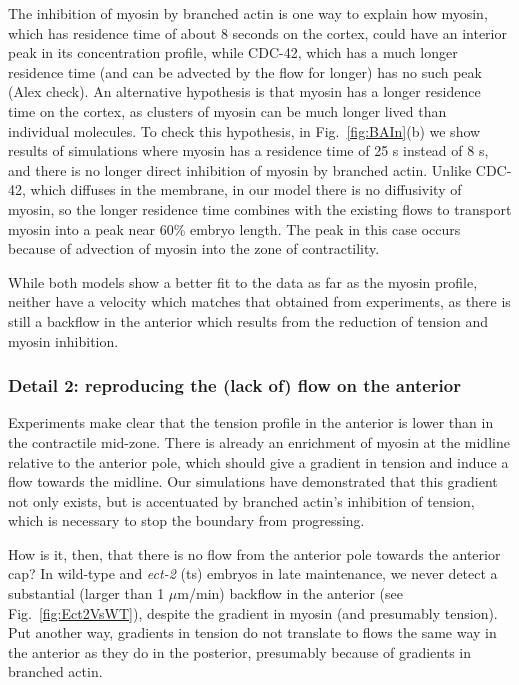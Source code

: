 \documentclass[11pt]{article}
\newcommand{\red}[1]{\color{red}#1\normalcolor}
\newcommand{\6}[1]{#1_{\text{6}}}
\newcommand{\3}[1]{#1_{\text{3}}}
\begin{document}
The inhibition of myosin by branched actin is one way to explain how myosin, which has residence time of about 8 seconds on the cortex, could have an interior peak in its concentration profile, while CDC-42, which has a much longer residence time (and can be advected by the flow for longer) \red{has no such peak (Alex check)}. An alternative hypothesis is that myosin has a longer residence time on the cortex, as clusters of myosin can be much longer lived than individual molecules. To check this hypothesis, in Fig.\ \ref{fig:BAIn}(b) we show results of simulations where myosin has a residence time of 25 s instead of 8 s, and there is no longer direct inhibition of myosin by branched actin. Unlike CDC-42, which diffuses in the membrane, in our model there is no diffusivity of myosin, so the longer residence time combines with the existing flows to transport myosin into a peak near 60\% embryo length. The peak in this case occurs because of advection of myosin into the zone of contractility. 

While both models show a better fit to the data as far as the myosin profile, neither have a velocity which matches that obtained from experiments, as there is still a backflow in the anterior which results from the reduction of tension and myosin inhibition. 

\subsubsection{Detail 2: reproducing the (lack of) flow on the anterior}
Experiments make clear that the tension profile in the anterior is lower than in the contractile mid-zone. There is already an enrichment of myosin at the midline relative to the anterior pole, which should give a gradient in tension and induce a flow towards the midline. Our simulations have demonstrated that this gradient not only exists, but is accentuated by branched actin's inhibition of tension, which is necessary to stop the boundary from progressing. 

How is it, then, that there is no flow from the anterior pole towards the anterior cap? In wild-type and \emph{ect-2} (ts) embryos in late maintenance, we never detect a substantial (larger than 1 $\mu$m/min) backflow in the anterior (see Fig.\ \ref{fig:Ect2VsWT}), despite the gradient in myosin (and presumably tension). Put another way, gradients in tension do not translate to flows the same way in the anterior as they do in the posterior, presumably because of gradients in branched actin.
\end{document}
